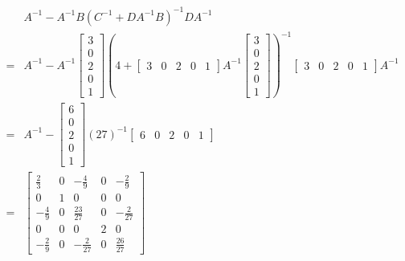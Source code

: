 \documentclass{article}
\theoremstyle{definition} %
\begin{document}
\begin{align*}
	&A^{-1}-A^{-1} B\left(C^{-1}+D A^{-1} B\right)^{-1} D A^{-1}\\
	=& A^{-1} - A^{-1}
	\begin{bmatrix}
		3 \\ 0 \\ 2 \\ 0 \\ 1
	\end{bmatrix}
	\left(
	4+
	\begin{bmatrix}
		3 & 0 & 2 & 0 & 1
	\end{bmatrix}
	A^{-1}
	\begin{bmatrix}
		3 \\ 0 \\ 2 \\ 0 \\ 1
	\end{bmatrix}
	\right)^{-1}
	\begin{bmatrix}
		3 & 0 & 2 & 0 & 1
	\end{bmatrix}
	A^{-1}\\
	=& A^{-1} - 
	\begin{bmatrix}
		6 \\ 0 \\ 2 \\ 0 \\ 1
	\end{bmatrix}
	(27)^{-1}
	\begin{bmatrix}
		6 & 0 & 2 & 0 & 1
	\end{bmatrix}\\
	=&
	\left[\begin{array}{ccccc}
		\frac{2}{3} & 0 & -\frac{4}{9} & 0 & -\frac{2}{9} \\
		0 & 1 & 0 & 0 & 0 \\
		-\frac{4}{9} & 0 & \frac{23}{27} & 0 & -\frac{2}{27} \\
		0 & 0 & 0 & 2 & 0 \\
		-\frac{2}{9} & 0 & -\frac{2}{27} & 0 & \frac{26}{27}
		\end{array}\right]
\end{align*}

\section{}
\subsection{}
\end{document}
